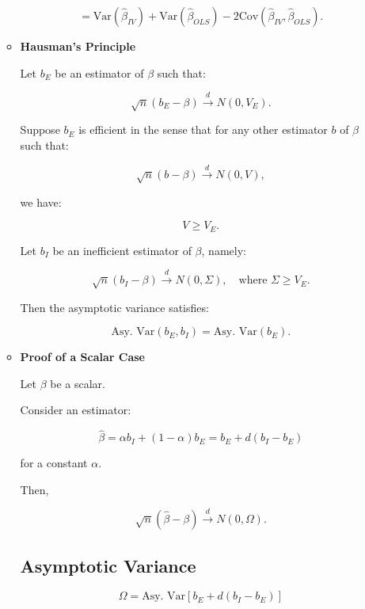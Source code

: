 \documentclass[12pt, oneside]{article}
\begin{document}
\begin{enumerate}
\begin{itemize}
            \[
            = \text{Var}(\hat{\beta}_{IV}) + \text{Var}(\hat{\beta}_{OLS}) - 2 \text{Cov}(\hat{\beta}_{IV}, \hat{\beta}_{OLS}).
            \]

        \item \textbf{Hausman’s Principle}

            Let \( b_E \) be an estimator of \( \beta \) such that:

            \[
            \sqrt{n} (b_E - \beta) \xrightarrow{d} N(0, V_E).
            \]

            Suppose \( b_E \) is efficient in the sense that for any other estimator \( b \) of \( \beta \) such that:

            \[
            \sqrt{n} (b - \beta) \xrightarrow{d} N(0, V),
            \]

            we have:

            \[
            V \geq V_E.
            \]

            Let \( b_I \) be an inefficient estimator of \( \beta \), namely:

            \[
            \sqrt{n} (b_I - \beta) \xrightarrow{d} N(0, \Sigma), \quad \text{where } \Sigma \geq V_E.
            \]

            Then the asymptotic variance satisfies:

            \[
            \text{Asy. Var}(b_E, b_I) = \text{Asy. Var}(b_E).
            \]
            \item \textbf{Proof of a Scalar Case}

            Let \( \beta \) be a scalar.
            
            Consider an estimator:
            
            \[
            \hat{\beta} = \alpha b_I + (1 - \alpha) b_E = b_E + d (b_I - b_E)
            \]
            
            for a constant \( \alpha \).
            
            Then,
            
            \[
            \sqrt{n} (\hat{\beta} - \beta) \xrightarrow{d} N(0, \Omega).
            \]
            
            \subsection*{Asymptotic Variance}
            \[
            \Omega = \text{Asy. Var}[b_E + d (b_I - b_E)]
            \]
            

\end{itemize}
\end{enumerate}
\end{document}
